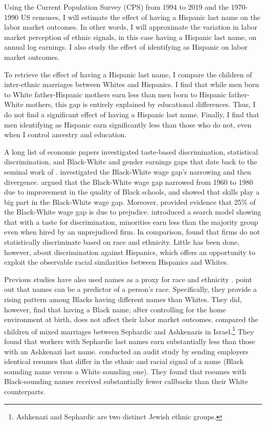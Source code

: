 \documentclass{wptemp}
\begin{document}
Using the Current Population Survey (CPS) from 1994 to 2019 and the 1970-1990 US censuses, I will estimate the effect of having a Hispanic last name on the labor market outcomes. In other words, I will approximate the variation in labor market perception of ethnic signals, in this case having a Hispanic last name, on annual log earnings. I also study the effect of identifying as Hispanic on labor market outcomes. 

To retrieve the effect of having a Hispanic last name, I compare the children of inter-ethnic marriages between Whites and Hispanics. I find that while men born to White father-Hispanic mothers earn less than men born to Hispanic father-White mothers, this gap is entirely explained by educational differences. Thus, I do not find a significant effect of having a Hispanic last name. Finally, I find that men identifying as Hispanic earn significantly less than those who do not, even when I control ancestry and education. 

A long list of economic papers investigated taste-based discrimination, statistical discrimination, and Black-White and gender earnings gaps that date back to the seminal work of \citet{becker2010economics}. \citet{bayer2018divergent} investigated the Black-White wage gap's narrowing and then divergence. \citet{card1992school} argued that the Black-White wage gap narrowed from 1960 to 1980 due to improvement in the quality of Black schools, and \citet{juhn1991accounting} showed that skills play a big part in the Black-White wage gap. Moreover,  \citet{charles2008prejudice} provided evidence that 25\% of the Black-White wage gap is due to prejudice. \citet{black1995discrimination} introduced a search model showing that with a taste for discrimination, minorities earn less than the majority group even when hired by an unprejudiced firm. In comparison, \citet{altonji2001employer} found that firms do not statistically discriminate based on race and ethnicity. Little has been done, however, about discrimination against Hispanics, which offers an opportunity to exploit the observable racial similarities between Hispanics and Whites.

Previous studies have also used names as a proxy for race and ethnicity \citep{fryer2004causes, rubinstein2014pride, bertrand2004emily}. \citet{fryer2004causes} point out that names can be a predictor of a person's race. Specifically, they provide a rising pattern among Blacks having different names than Whites. They did, however, find that having a Black name, after controlling for the home environment at birth, does not affect their labor market outcomes. \citet{rubinstein2014pride} compared the children of mixed marriages between Sephardic and Ashkenazis in Israel.\footnote{Ashkenazi and Sephardic are two distinct Jewish ethnic groups.} They found that workers with Sephardic last names earn substantially less than those with an Ashkenazi last name. \citet{bertrand2004emily} conducted an audit study by sending employers identical resumes that differ in the ethnic and racial signal of a name (Black sounding name versus a White sounding one). They found that resumes with Black-sounding names received substantially fewer callbacks than their White counterparts. 
\end{document}
